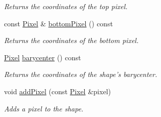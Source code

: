 \begin{CompactItemize}
\begin{CompactList}\small\item\em Returns the coordinates of the top pixel. \item\end{CompactList}\item 
const \hyperlink{_pixel_8hpp_535e59456e3e633842529cfa8ea103c4}{Pixel} \& \hyperlink{class_shape_99293804122214fa366d7f7ae794d077}{bottomPixel} () const 
\begin{CompactList}\small\item\em Returns the coordinates of the bottom pixel. \item\end{CompactList}\item 
\hyperlink{_pixel_8hpp_535e59456e3e633842529cfa8ea103c4}{Pixel} \hyperlink{class_shape_a935b8870ea61569990b304b77513923}{barycenter} () const 
\begin{CompactList}\small\item\em Returns the coordinates of the shape's barycenter. \item\end{CompactList}\item 
void \hyperlink{class_shape_f6114234203d9473f1fef9e6391f9243}{addPixel} (const \hyperlink{_pixel_8hpp_535e59456e3e633842529cfa8ea103c4}{Pixel} \&pixel)
\begin{CompactList}\small\item\em Adds a pixel to the shape. \item\end{CompactList}\end{CompactItemize}
